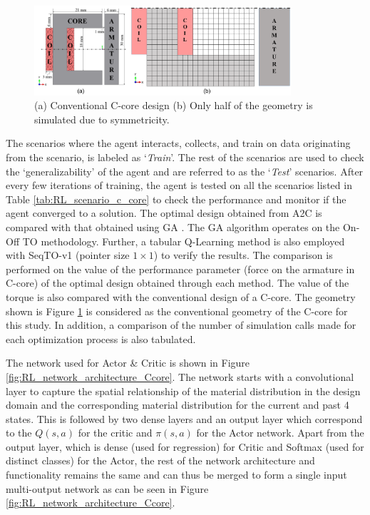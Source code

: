 \begin{figure}[h!]
    \centering
    \includegraphics[width=0.85\textwidth]{Figures/Ch_RL/c_core_conventional_latex.png}
    \caption{(a) Conventional C-core design (b) Only half of the geometry is simulated due to symmetricity.}
    \label{fig:RL_c_core_conventional_latex}
\end{figure}

The scenarios where the agent interacts, collects, and train on data originating from the scenario, is labeled as `\textit{Train}’. The rest of the scenarios are used to check the `generalizability' of the agent and are referred to as the `\textit{Test}’ scenarios. After every few iterations of training, the agent is tested on all the scenarios listed in Table \ref{tab:RL_scenario_c_core} to check the performance and monitor if the agent converged to a solution. The optimal design obtained from A2C is compared with that obtained using GA \parencite{park2009magnetic, midha2019selection}. The GA algorithm operates on the On-Off TO methodology. Further, a tabular Q-Learning method is also employed with SeqTO-v1 (pointer size $1 \times 1$) to verify the results. The comparison is performed on the value of the performance parameter (force on the armature in C-core) of the optimal design obtained through each method. The value of the torque is also compared with the conventional design of a C-core. The geometry shown is Figure \ref{fig:RL_c_core_conventional_latex} is considered as the conventional geometry of the C-core for this study. In addition, a comparison of the number of simulation calls made for each optimization process is also tabulated. 

The network used for Actor \& Critic is shown in Figure \ref{fig:RL_network_architecture_Ccore}. The network starts with a convolutional layer to capture the spatial relationship of the material distribution in the design domain and the corresponding material distribution for the current and past 4 states. This is followed by two dense layers and an output layer which correspond to the $Q(s,a)$ for the critic and $\pi(s,a)$ for the Actor network. Apart from the output layer, which is dense (used for regression) for Critic and Softmax (used for distinct classes) for the Actor, the rest of the network architecture and functionality remains the same and can thus be merged to form a single input multi-output network as can be seen in Figure \ref{fig:RL_network_architecture_Ccore}.

